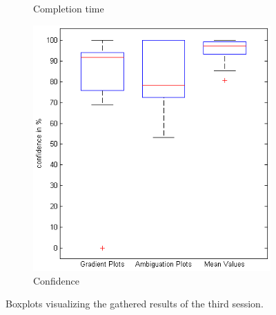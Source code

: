 \begin{figure}[H]
\begin{subfigure}[b]{0.32\textwidth}
        \caption{Completion time}
        \label{fig:s3_time}
    \end{subfigure}
		\begin{subfigure}[b]{0.32\textwidth}
        \includegraphics[width=\textwidth]{figures/boxplots/s3_confidence.png}
        \caption{Confidence}
        \label{fig:s3_confidence}
    \end{subfigure}
    \caption{Boxplots visualizing the gathered results of the third session.}
		\label{fig:s3_boxplots}
\end{figure}

